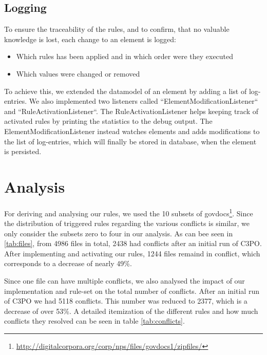 \documentclass[a4paper,12pt]{article}
\begin{document}
\subsection{Logging}

To ensure the traceability of the rules, and to confirm, that no valuable knowledge is lost, each change to an element is logged:
\begin{itemize}
\item Which rules has been applied and in which order were they executed
\item Which values were changed or removed
\end{itemize}

To achieve this, we extended the datamodel of an element by adding a list of log-entries. We also implemented two listeners called ``ElementModificationListener`` and ``RuleActivationListener``. The RuleActivationListener helps keeping track of activated rules by printing the statistics to the debug output.
The ElementModificationListener instead watches elements and adds modifications to the list of log-entries, which will finally be stored in database, when the element is persisted.


\section{Analysis}

For deriving and analysing our rules, we used the 10 subsets of govdocs\footnote{\url{http://digitalcorpora.org/corp/nps/files/govdocs1/zipfiles/}}.
Since the distribution of triggered rules regarding the various conflicts is similar, we only consider the subsets zero to four in our analysis.
As can bee seen in \ref{tab:files}, from 4986 files in total, 2438 had conflicts after an initial run of C3PO. After implementing and activating our rules, 1244 files remaind in conflict, which corresponds to a decrease of nearly 49\%.

Since one file can have multiple conflicts, we also analysed the impact of our implementation and rule-set on the total number of conflicts.
After an initial run of C3PO we had 5118 conflicts. This number was reduced to 2377, which is a decrease of over 53\%.
A detailed itemization of the different rules and how much conflicts they resolved can be seen in table \ref{tab:conflicts}.
\end{document}
